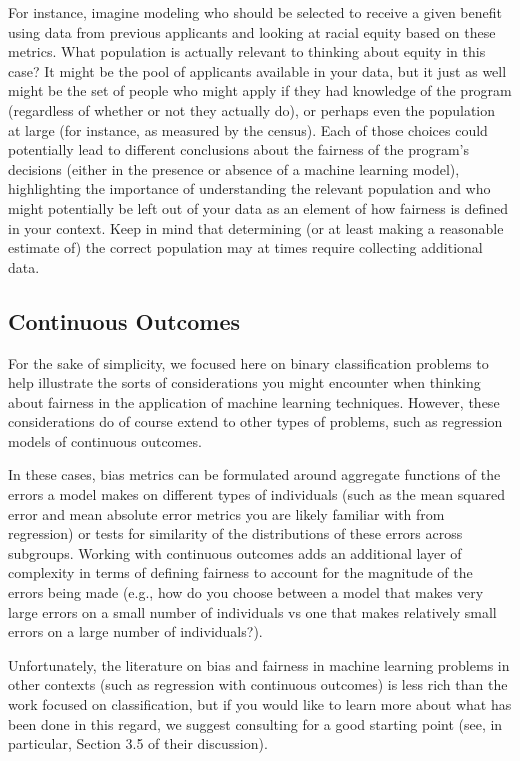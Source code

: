 \documentclass[]{krantz}
\begin{document}
For instance, imagine modeling who should be selected to receive a given
benefit using data from previous applicants and looking at racial equity
based on these metrics. What population is actually relevant to thinking
about equity in this case? It might be the pool of applicants available
in your data, but it just as well might be the set of people who might
apply if they had knowledge of the program (regardless of whether or not
they actually do), or perhaps even the population at large (for
instance, as measured by the census). Each of those choices could
potentially lead to different conclusions about the fairness of the
program's decisions (either in the presence or absence of a machine
learning model), highlighting the importance of understanding the
relevant population and who might potentially be left out of your data
as an element of how fairness is defined in your context. Keep in mind
that determining (or at least making a reasonable estimate of) the
correct population may at times require collecting additional data.

\subsection{Continuous Outcomes}\label{continuous-outcomes}

For the sake of simplicity, we focused here on binary classification
problems to help illustrate the sorts of considerations you might
encounter when thinking about fairness in the application of machine
learning techniques. However, these considerations do of course extend
to other types of problems, such as regression models of continuous
outcomes.

In these cases, bias metrics can be formulated around aggregate
functions of the errors a model makes on different types of individuals
(such as the mean squared error and mean absolute error metrics you are
likely familiar with from regression) or tests for similarity of the
distributions of these errors across subgroups. Working with continuous
outcomes adds an additional layer of complexity in terms of defining
fairness to account for the magnitude of the errors being made (e.g.,
how do you choose between a model that makes very large errors on a
small number of individuals vs one that makes relatively small errors on
a large number of individuals?).

Unfortunately, the literature on bias and fairness in machine learning
problems in other contexts (such as regression with continuous outcomes)
is less rich than the work focused on classification, but if you would
like to learn more about what has been done in this regard, we suggest
consulting \citep{chouldechova2018} for a good starting point (see, in
particular, Section 3.5 of their discussion).
\end{document}
